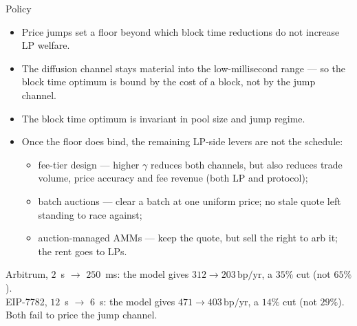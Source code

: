 \documentclass[10pt,xcolor=x11names,aspectratio=169]{beamer}
\newcommand{\1}{\mathbf{1}}
\newcommand{\bpyr}{\,\text{bp/yr}}
\begin{document}
\begin{frame}{Policy}
  \begin{itemize}
    \item Price jumps set a floor beyond which block time reductions do not increase LP welfare.
    \item The diffusion channel stays material into the low-millisecond range ---
          so the block time optimum is bound by the cost of a block, not by the jump channel.
    \item The block time optimum is invariant in pool size and jump regime.
    \item Once the floor does bind, the remaining LP-side levers are not the
          schedule:
      \begin{itemize}
        \item fee-tier design --- higher $\gamma$ reduces both channels, but also reduces
              trade volume, price accuracy and fee revenue (both LP and protocol);
        \item batch auctions --- clear a batch at one uniform price; no
              stale quote left standing to race against;
        \item auction-managed AMMs --- keep the quote, but sell the right
              to arb it; the rent goes to LPs.
      \end{itemize}
  \end{itemize}
  \begin{rwexample}
    Arbitrum, $2$~s $\to$ $250$~ms: the model gives $312 \to 203\bpyr$, a $35\%$ cut (not $65\%$).\\
    EIP-7782, $12$~s $\to$ $6$~s: the model gives $471 \to 403\bpyr$, a
    $14\%$ cut (not $29\%$).\\
    Both fail to price the jump channel.
  \end{rwexample}
\end{frame}
\end{document}
